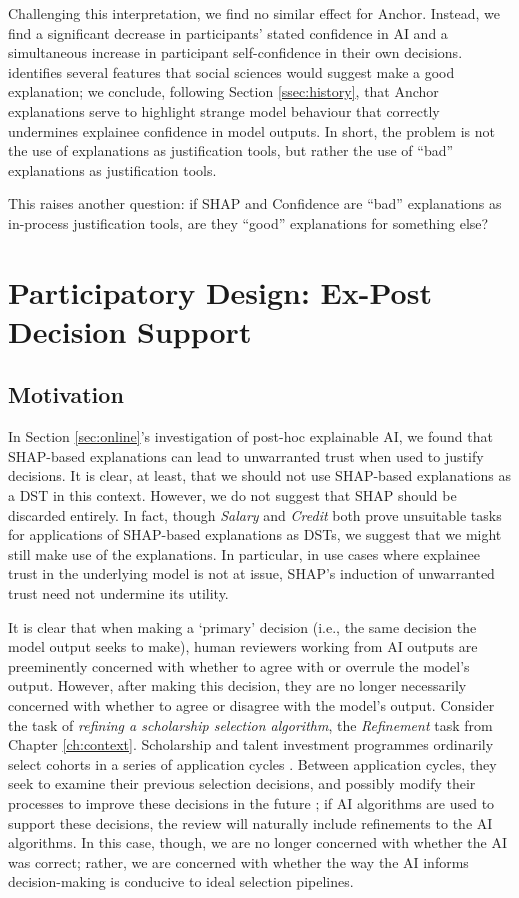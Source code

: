 Challenging this interpretation, we find no similar effect for Anchor. Instead, we find a significant decrease in participants' stated confidence in AI and a simultaneous increase in participant self-confidence in their own decisions. \textcite{miller_explanation_2017} identifies several features that social sciences would suggest make a good explanation; we conclude, following Section \ref{ssec:history}, that Anchor explanations serve to highlight strange model behaviour that correctly undermines explainee confidence in model outputs. In short, the problem is not the use of explanations as justification tools, but rather the use of ``bad'' explanations as justification tools.

This raises another question: if SHAP and Confidence are ``bad'' explanations as in-process justification tools, are they ``good'' explanations for something else?

\section[Participatory Design]{Participatory Design: Ex-Post Decision Support}\label{sec:xaicase}
\subsection{Motivation}
In Section \ref{sec:online}'s investigation of post-hoc explainable AI, we found that SHAP-based explanations can lead to unwarranted trust when used to justify decisions. It is clear, at least, that we should not use SHAP-based explanations as a DST in this context. However, we do not suggest that SHAP should be discarded entirely. In fact, though \emph{Salary} and \emph{Credit} both prove unsuitable tasks for applications of SHAP-based explanations as DSTs, we suggest that we might still make use of the explanations. In particular, in use cases where explainee trust in the underlying model is not at issue, SHAP's induction of unwarranted trust need not undermine its utility.

It is clear that when making a `primary' decision (i.e., the same decision the model output seeks to make), human reviewers working from AI outputs are preeminently concerned with whether to agree with or overrule the model's output. However, after making this decision, they are no longer necessarily concerned with whether to agree or disagree with the model's output. Consider the task of \emph{refining a scholarship selection algorithm}, the \emph{Refinement} task from Chapter \ref{ch:context}. Scholarship and talent investment programmes ordinarily select cohorts in a series of application cycles \cite{li2020hiring}. Between application cycles, they seek to examine their previous selection decisions, and possibly modify their processes to improve these decisions in the future \cite{li2020hiring}; if AI algorithms are used to support these decisions, the review will naturally include refinements to the AI algorithms. In this case, though, we are no longer concerned with whether the AI was correct; rather, we are concerned with whether the way the AI informs decision-making is conducive to ideal selection pipelines.

